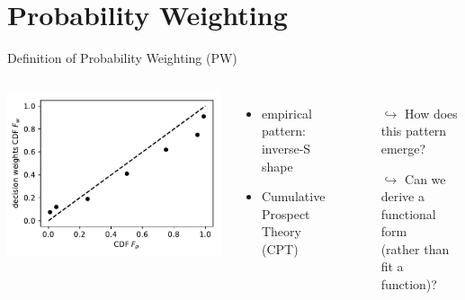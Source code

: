 \section{Probability Weighting}

\begin{frame}{Definition of Probability Weighting (PW)}

\begin{columns}%
{\centering	\includegraphics[width=.9\textwidth]{../figs/PB48.pdf} }
\parencite[p. 188, Fig. 1, relabelled axes]{PrestonBaratta1948}

\begin{itemize}
  \item empirical pattern: inverse-S shape
  \item Cumulative Prospect Theory (CPT) \nocite{}
\end{itemize}
\vspace{1em}
\bi
	\item	{}
\ei
\vspace{1em}
	\begin{itemize}
	  \item[$\hookrightarrow$] How does this pattern emerge?
  	\item[$\hookrightarrow$] Can we derive a functional form\\ 
	(rather than fit a function)?
	\end{itemize}

\end{columns}
\end{frame}

